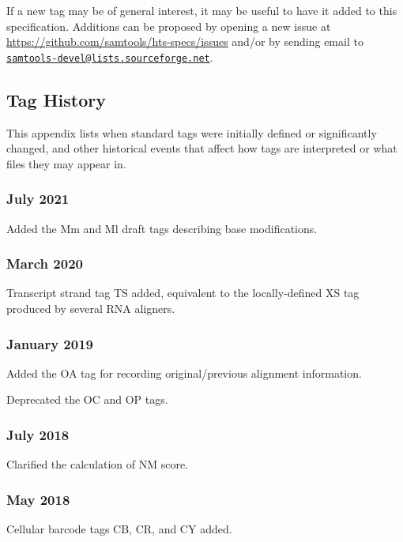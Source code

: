 \documentclass[10pt]{article}
\newcommand{\mailtourl}[1]{\href{mailto:#1}{\tt #1}}
\begin{document}
If a new tag may be of general interest, it may be useful to have it added
to this specification.  Additions can be proposed by opening a new issue at
\url{https://github.com/samtools/hts-specs/issues} and/or by sending email
to \mailtourl{samtools-devel@lists.sourceforge.net}.

\begin{appendices}
\appendix
\section{Tag History}

This appendix lists when standard tags were initially defined or significantly changed, and other historical events that affect how tags are interpreted or what files they may appear in.

\setlength{\parindent}{0pt}
\newcommand*{\gap}{\vspace*{2ex}}

\subsubsection*{July 2021}
Added the Mm and Ml draft tags describing base modifications.

\subsubsection*{March 2020}

Transcript strand tag TS added, equivalent to the locally-defined XS tag
produced by several RNA aligners.

\subsubsection*{January 2019}
Added the OA tag for recording original/previous alignment information.

Deprecated the OC and OP tags.

\subsubsection*{July 2018}

Clarified the calculation of NM score.

\subsubsection*{May 2018}

Cellular barcode tags CB, CR, and CY added.


\end{appendices}
\end{document}
